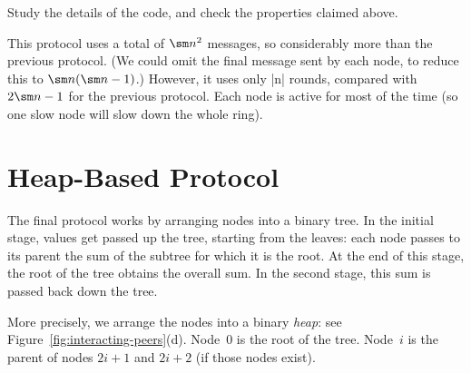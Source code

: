 \begin{instruction}
Study the details of the code, and check the properties claimed above.
\end{instruction}

This protocol uses a total of $\sm n^2$ messages, so considerably more than
the previous protocol.  (We could omit the final message sent by each node, to
reduce this to $\sm n(\sm n - 1)$.)  However, it uses only |n| rounds,
compared with $2\sm n-1$ for the previous protocol.  Each node is active for
most of the time (so one slow node will slow down the whole ring).


\section{Heap-Based Protocol}

The final protocol works by arranging nodes into a binary tree.  In the
initial stage, values get passed up the tree, starting from the leaves: each
node passes to its parent the sum of the subtree for which it is the root.  At
the end of this stage, the root of the tree obtains the overall sum.  In the
second stage, this sum is passed back down the tree.

More precisely, we arrange the nodes into a binary \emph{heap}: see Figure~\ref{fig:interacting-peers}(d).  Node~$0$ is the
root of the tree.  Node~$i$ is the parent of nodes $2i+1$ and $2i+2$ (if those
nodes exist).



